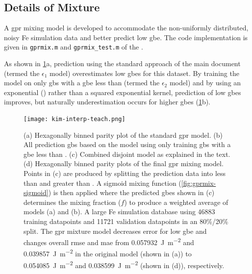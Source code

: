 \documentclass[preprint,12pt]{elsarticle}
\begin{document}
\subsection{Details of  Mixture}
\label{sec:supp:kim-interp:method}

A \gls{gpr} mixing model is developed to accommodate the non-uniformly distributed, noisy Fe simulation data \cite{kimPhasefieldModeling3D2014} and better predict low \gls{gbe}. The code implementation is given in \texttt{gprmix.m} and \texttt{gprmix\_test.m} of the \vfzorepo{} \cite{bairdFiveDegreeofFreedom5DOF2020}.

As shown in \cref{fig:kim-interp-teach}a, prediction using the standard approach of the main document (termed the $\epsilon_1$ model) overestimates low \glspl{gbe} for this dataset. By training the model on only \glspl{gb} with a \gls{gbe} less than \thrtwo{} (termed the $\epsilon_2$ model) and by using an exponential () rather than a squared exponential kernel, prediction of low \glspl{gbe} improves, but naturally underestimation occurs for higher \glspl{gbe} (\cref{fig:kim-interp-teach}b).

\begin{figure}
    \centering
    \texttt{[image: kim-interp-teach.png]}
    \caption{(a) Hexagonally binned parity plot of the standard \gls{gpr} model. (b) All prediction \glspl{gb} based on the model using only training \glspl{gb} with a \gls{gbe} less than \thrtwo{}. (c) Combined disjoint model as explained in the text. (d) Hexagonally binned parity plots of the final \gls{gpr} mixing model. Points in (c) are produced by splitting the prediction data into less than and greater than \thr{}. A sigmoid mixing function (\cref{fig:gprmix-sigmoid}) is then applied where the predicted \glspl{gbe} shown in (c) determines the mixing fraction ($f$) to produce a weighted average of models (a) and (b). A large Fe simulation database \cite{kimPhasefieldModeling3D2014} using \num{46883} training datapoints and \num{11721} validation datapoints in an 80\%/20\% split. The \gls{gpr} mixture model decreases error for low \gls{gbe} and changes overall \gls{rmse} and \gls{mae} from \SI{0.057932}{\J\per\square\meter} and \SI{0.039857}{\J\per\square\meter} in the original model (shown in (a)) to \SI{0.054085}{\J\per\square\meter} and \SI{0.038599}{\J\per\square\meter} (shown in (d)), respectively.}
    \label{fig:kim-interp-teach}
\end{figure}
\end{document}

